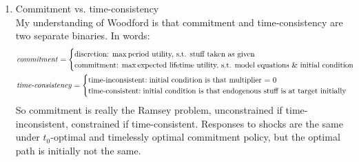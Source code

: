 \documentclass[11pt]{article}
\renewcommand{\[}{\begin{equation}}
\renewcommand{\]}{\end{equation}}
\begin{document}
\begin{enumerate}
\item Commitment vs. time-consistency \\
My understanding of Woodford is that commitment and time-consistency are two separate binaries. In words:
\begin{align*}
& \text{\emph{commitment}} = \begin{cases} \text{discretion:} \; \max \text{period utility, s.t. stuff taken as given}\\
\text{commitment:} \; \max \text{expected lifetime utility, s.t. model equations \& initial condition}
\end{cases} \\
& \text{\emph{time-consistency}} = \begin{cases} \text{time-inconsistent:} \; \text{initial condition is that multiplier = 0}\\
\text{time-consistent:} \;  \text{initial condition is that endogenous stuff is at target initially}
\end{cases}
\end{align*}
So commitment is really the Ramsey problem, unconstrained if time-inconsistent, constrained if time-consistent. Responses to shocks are the same under $t_0$-optimal and timelessly optimal commitment policy, but the optimal path is initially not the same. 


\end{enumerate}
\end{document}

